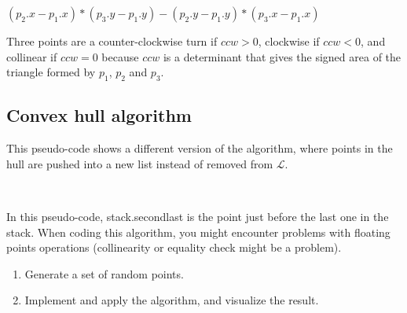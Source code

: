 {\SetCustomAlgoRuledWidth{0pt}
\begin{algorithm}[H]
  {
  \KwRet $(p_2.x - p_1.x)*(p_3.y - p_1.y) - (p_2.y - p_1.y)*(p_3.x - p_1.x)$ \;
 }
\end{algorithm}
}

Three points are a counter-clockwise turn if $ccw > 0$, clockwise if $ccw < 0$, and collinear if $ccw = 0$ because $ccw$ is a determinant that gives the signed area of the triangle formed by $p_1$, $p_2$ and $p_3$.

    
\subsection{Convex hull algorithm}
This pseudo-code shows a different version of the algorithm, where points in the hull are pushed into a new list instead of removed from $\mathcal{L}$.

{\SetCustomAlgoRuledWidth{0pt}
\begin{algorithm}[H]
 \\
	
\end{algorithm}
}

In this pseudo-code, stack.secondlast is the point just before the last one in the stack. When coding this algorithm, you might encounter problems with floating points operations (collinearity or equality check might be a problem).


\begin{qbox}
\begin{enumerate}
	\item Generate a set of random points.
	\item Implement and apply the algorithm, and visualize the result.
\end{enumerate}

\end{qbox}
